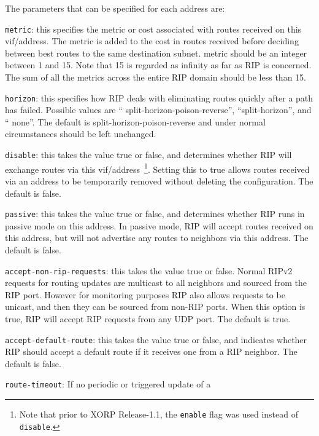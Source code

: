 \begin{description}
  The parameters that can be specified for each address are:
\begin{description}
\item{\tt metric}: this specifies the metric or cost associated with
  routes received on this vif/address.  The metric is added to the
  cost in routes received before deciding between best routes to the
  same destination subnet.  {\stt metric} should be an integer between
  1 and 15.  Note that 15 is regarded as infinity as far as RIP is
  concerned.  The sum of all the metrics across the entire RIP domain
  should be less than 15.
\item{\tt horizon}: this specifies how RIP deals with eliminating
  routes quickly after a path has failed.  Possible values are ``{\stt
  split-horizon-poison-reverse}'', ``{\stt split-horizon}'', and ``{\stt
  none}''.  The default is {\stt split-horizon-poison-reverse} and under
  normal circumstances should be left unchanged.
\item{\tt disable}: this takes the value {\stt true} or {\stt false},
  and determines whether RIP will exchange routes via this
  vif/address~\footnote{Note
  that prior to XORP Release-1.1, the {\tt enable} flag was used instead of
  {\tt disable}.}.
  Setting this to {\stt true} allows routes received
  via an address to be temporarily removed without deleting the
  configuration.  The default is {\stt false}.
\item{\tt passive}: this takes the value {\stt true} or {\stt false},
  and determines whether RIP runs in passive mode on this address.  In
  passive mode, RIP will accept routes received on this address, but
  will not advertise any routes to neighbors via this address.  The
  default is {\stt false}.
\item{\tt accept-non-rip-requests}: this takes the value {\stt true}
  or {\stt false}.  Normal RIPv2 requests for routing updates are
  multicast to all neighbors and sourced from the RIP port.  However
  for monitoring purposes RIP also allows requests to be unicast, and
  then they can be sourced from non-RIP ports.  When this option is
  {\stt true}, RIP will accept RIP requests from any UDP port.  The
  default is {\stt true}.
\item{\tt accept-default-route}: this takes the value {\stt true} or
  {\stt false}, and indicates whether RIP should accept a default
  route if it receives one from a RIP neighbor.  The default is {\stt
  false}.
\item{\tt route-timeout}: If no periodic or triggered update of a

\end{description}
\end{description}

